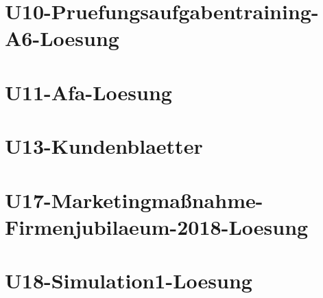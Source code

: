 \chapter{U10-Pruefungsaufgabentraining-A6-Loesung}
%
\chapter{U11-Afa-Loesung}
%
\chapter{U13-Kundenblaetter}
%
\chapter{U17-Marketingmaßnahme-Firmenjubilaeum-2018-Loesung}
%
\chapter{U18-Simulation1-Loesung}
%



%
%



%



